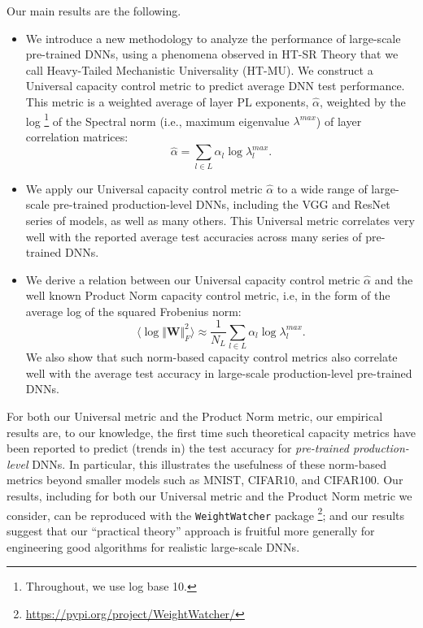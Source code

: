 Our main results are the following.
\begin{itemize}
\item
We introduce a new methodology to analyze the performance of large-scale pre-trained DNNs, using a phenomena observed in HT-SR Theory that we call Heavy-Tailed Mechanistic Universality (HT-MU).
We construct a Universal capacity control metric to predict average DNN test performance.
This metric is a weighted average of layer PL exponents, $\hat{\alpha}$, weighted by the log%
\footnote{Throughout, we use log base 10.}
of the Spectral norm (i.e., maximum eigenvalue $\lambda^{max}$) of layer correlation matrices: 
$$
\hat{\alpha}=\sum_{l\in L}\alpha_{l}\log\lambda_{l}^{max}  .
$$
\item
We apply our Universal capacity control metric $\hat{\alpha}$ to a wide range of large-scale pre-trained production-level DNNs, including the VGG and ResNet series of models, as well as many others.
This Universal metric correlates very well with the reported average test accuracies across many series of pre-trained DNNs.
\item
We derive a relation between our Universal capacity control metric $\hat{\alpha}$ and the well known Product Norm capacity control metric, i.e, in the form of the average log of the squared Frobenius norm:
$$
\langle\log\Vert\mathbf{W}\Vert^{2}_{F}\rangle\approx \frac{1}{N_L}\sum_{l\in L} \alpha_{l}\log\lambda_{l}^{max}  .
$$
We also show that
such norm-based capacity control metrics also correlate well with the average test accuracy in large-scale production-level pre-trained DNNs.
\end{itemize}


For both our Universal metric and the Product Norm metric, our empirical results are, to our knowledge, the first time such theoretical capacity metrics have been reported to predict (trends in) the test accuracy for \emph{pre-trained production-level} DNNs.
In particular, this illustrates the usefulness of these norm-based metrics beyond smaller models such as MNIST, CIFAR10, and CIFAR100. 
Our 
results, including for both our Universal metric and the Product Norm metric we consider, can be reproduced with the \texttt{WeightWatcher} package%
\footnote{\url{https://pypi.org/project/WeightWatcher/}};
and our
results suggest that our ``practical theory'' approach is fruitful more generally for engineering good algorithms for realistic large-scale DNNs.


